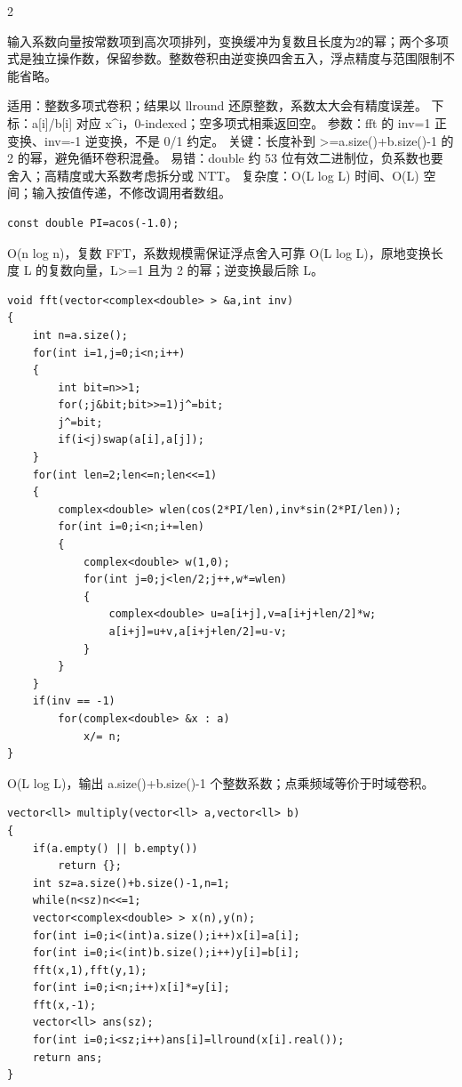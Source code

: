 \documentclass[UTF8,fontset=fandol,a4paper,twoside]{ctexart}
\newcommand{\note}[1]{{\fontsize{10}{12}\selectfont #1\par}}
\begin{document}
\begin{multicols}{2}
\note{输入系数向量按常数项到高次项排列，变换缓冲为复数且长度为2的幂；两个多项式是独立操作数，保留参数。整数卷积由逆变换四舍五入，浮点精度与范围限制不能省略。}
\note{适用：整数多项式卷积；结果以 llround 还原整数，系数太大会有精度误差。 下标：a[\allowbreak{}i]\allowbreak{}/\allowbreak{}b[\allowbreak{}i]\allowbreak{} 对应 x\textasciicircum{}i，0-\allowbreak{}indexed；空多项式相乘返回空。 参数：fft 的 inv=\allowbreak{}1 正变换、inv=\allowbreak{}-\allowbreak{}1 逆变换，不是 0/\allowbreak{}1 约定。 关键：长度补到 >\allowbreak{}=\allowbreak{}a.\allowbreak{}size(\allowbreak{})\allowbreak{}+\allowbreak{}b.\allowbreak{}size(\allowbreak{})\allowbreak{}-\allowbreak{}1 的 2 的幂，避免循环卷积混叠。 易错：double 约 53 位有效二进制位，负系数也要舍入；高精度或大系数考虑拆分或 NTT。 复杂度：O(\allowbreak{}L log L)\allowbreak{} 时间、O(\allowbreak{}L)\allowbreak{} 空间；输入按值传递，不修改调用者数组。}
\begin{lstlisting}
const double PI=acos(-1.0);
\end{lstlisting}
\note{O(\allowbreak{}n log n)\allowbreak{}，复数 FFT，系数规模需保证浮点舍入可靠 O(\allowbreak{}L log L)\allowbreak{}，原地变换长度 L 的复数向量，L>\allowbreak{}=\allowbreak{}1 且为 2 的幂；逆变换最后除 L。}
\begin{lstlisting}
void fft(vector<complex<double> > &a,int inv)
{
    int n=a.size();
    for(int i=1,j=0;i<n;i++)
    {
        int bit=n>>1;
        for(;j&bit;bit>>=1)j^=bit;
        j^=bit;
        if(i<j)swap(a[i],a[j]);
    }
    for(int len=2;len<=n;len<<=1)
    {
        complex<double> wlen(cos(2*PI/len),inv*sin(2*PI/len));
        for(int i=0;i<n;i+=len)
        {
            complex<double> w(1,0);
            for(int j=0;j<len/2;j++,w*=wlen)
            {
                complex<double> u=a[i+j],v=a[i+j+len/2]*w;
                a[i+j]=u+v,a[i+j+len/2]=u-v;
            }
        }
    }
    if(inv == -1)
        for(complex<double> &x : a)
            x/= n;
}
\end{lstlisting}
\note{O(\allowbreak{}L log L)\allowbreak{}，输出 a.\allowbreak{}size(\allowbreak{})\allowbreak{}+\allowbreak{}b.\allowbreak{}size(\allowbreak{})\allowbreak{}-\allowbreak{}1 个整数系数；点乘频域等价于时域卷积。}
\begin{lstlisting}
vector<ll> multiply(vector<ll> a,vector<ll> b)
{
    if(a.empty() || b.empty())
        return {};
    int sz=a.size()+b.size()-1,n=1;
    while(n<sz)n<<=1;
    vector<complex<double> > x(n),y(n);
    for(int i=0;i<(int)a.size();i++)x[i]=a[i];
    for(int i=0;i<(int)b.size();i++)y[i]=b[i];
    fft(x,1),fft(y,1);
    for(int i=0;i<n;i++)x[i]*=y[i];
    fft(x,-1);
    vector<ll> ans(sz);
    for(int i=0;i<sz;i++)ans[i]=llround(x[i].real());
    return ans;
}
\end{lstlisting}

\end{multicols}
\end{document}
